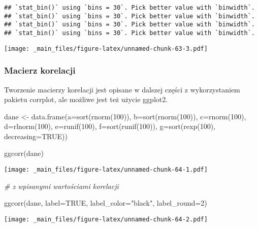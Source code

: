 \documentclass[
]{book}
\newenvironment{Shaded}{\begin{snugshade}}{\end{snugshade}}
\newcommand{\AttributeTok}[1]{\textcolor[rgb]{0.77,0.63,0.00}{#1}}
\newcommand{\CommentTok}[1]{\textcolor[rgb]{0.56,0.35,0.01}{\textit{#1}}}
\newcommand{\ConstantTok}[1]{\textcolor[rgb]{0.00,0.00,0.00}{#1}}
\newcommand{\DecValTok}[1]{\textcolor[rgb]{0.00,0.00,0.81}{#1}}
\newcommand{\FunctionTok}[1]{\textcolor[rgb]{0.00,0.00,0.00}{#1}}
\newcommand{\NormalTok}[1]{#1}
\newcommand{\OtherTok}[1]{\textcolor[rgb]{0.56,0.35,0.01}{#1}}
\newcommand{\StringTok}[1]{\textcolor[rgb]{0.31,0.60,0.02}{#1}}
\begin{document}
\begin{verbatim}
## `stat_bin()` using `bins = 30`. Pick better value with `binwidth`.
## `stat_bin()` using `bins = 30`. Pick better value with `binwidth`.
## `stat_bin()` using `bins = 30`. Pick better value with `binwidth`.
## `stat_bin()` using `bins = 30`. Pick better value with `binwidth`.
\end{verbatim}

\texttt{[image: \_main\_files/figure-latex/unnamed-chunk-63-3.pdf]}

\hypertarget{macierz-korelacji}{%
\subsubsection{Macierz korelacji}\label{macierz-korelacji}}

Tworzenie macierzy korelacji jest opisane w dalszej części z wykorzystaniem pakietu corrplot, ale możliwe jest też użycie ggplot2.

\begin{Shaded}
\begin{Highlighting}[]
\NormalTok{dane }\OtherTok{\textless{}{-}} \FunctionTok{data.frame}\NormalTok{(}\AttributeTok{a=}\FunctionTok{sort}\NormalTok{(}\FunctionTok{rnorm}\NormalTok{(}\DecValTok{100}\NormalTok{)), }\AttributeTok{b=}\FunctionTok{sort}\NormalTok{(}\FunctionTok{rnorm}\NormalTok{(}\DecValTok{100}\NormalTok{)), }\AttributeTok{c=}\FunctionTok{rnorm}\NormalTok{(}\DecValTok{100}\NormalTok{), }\AttributeTok{d=}\FunctionTok{rlnorm}\NormalTok{(}\DecValTok{100}\NormalTok{), }\AttributeTok{e=}\FunctionTok{runif}\NormalTok{(}\DecValTok{100}\NormalTok{),}
                   \AttributeTok{f=}\FunctionTok{sort}\NormalTok{(}\FunctionTok{runif}\NormalTok{(}\DecValTok{100}\NormalTok{)), }\AttributeTok{g=}\FunctionTok{sort}\NormalTok{(}\FunctionTok{rexp}\NormalTok{(}\DecValTok{100}\NormalTok{), }\AttributeTok{decreasing=}\ConstantTok{TRUE}\NormalTok{))}

\FunctionTok{ggcorr}\NormalTok{(dane)}
\end{Highlighting}
\end{Shaded}

\texttt{[image: \_main\_files/figure-latex/unnamed-chunk-64-1.pdf]}

\begin{Shaded}
\begin{Highlighting}[]
\CommentTok{\# z wpisanymi wartościami korelacji}

\FunctionTok{ggcorr}\NormalTok{(dane, }\AttributeTok{label=}\ConstantTok{TRUE}\NormalTok{, }\AttributeTok{label\_color=}\StringTok{"black"}\NormalTok{, }\AttributeTok{label\_round=}\DecValTok{2}\NormalTok{)}
\end{Highlighting}
\end{Shaded}

\texttt{[image: \_main\_files/figure-latex/unnamed-chunk-64-2.pdf]}

  
\end{document}
